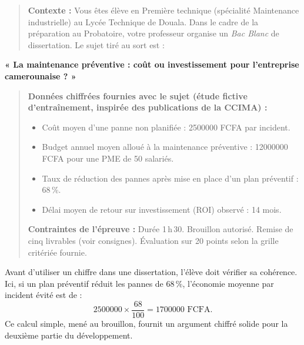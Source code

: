 \documentclass[11pt]{article}
\newcounter{popsec}
\newcounter{popsub}
\newcommand{\courssub}[1]{%
  \stepcounter{popsub}%
  \par\vspace{9pt}\noindent{\popxbold\fontsize{11.5}{13}\selectfont\color{popink}{\color{poporange}\thepopsec.\thepopsub}\hspace{6pt}#1}\par\nopagebreak\vspace{4pt}
}
\begin{document}
\courssub{Situation}
\begin{quote}
\textbf{Contexte :} Vous êtes élève en Première technique (spécialité Maintenance industrielle) au Lycée Technique de Douala. Dans le cadre de la préparation au Probatoire, votre professeur organise un \emph{Bac Blanc} de dissertation. Le sujet tiré au sort est :
\end{quote}
\begin{center}
\textbf{« La maintenance préventive : coût ou investissement pour l'entreprise camerounaise ? »}
\end{center}
\begin{quote}
\textbf{Données chiffrées fournies avec le sujet (étude fictive d'entraînement, inspirée des publications de la CCIMA) :}
\begin{itemize}
    \item Coût moyen d'une panne non planifiée : \num{2500000} FCFA par incident.
    \item Budget annuel moyen alloué à la maintenance préventive : \num{12000000} FCFA pour une PME de 50 salariés.
    \item Taux de réduction des pannes après mise en place d'un plan préventif : 68\,\%.
    \item Délai moyen de retour sur investissement (ROI) observé : 14 mois.
\end{itemize}
\textbf{Contraintes de l'épreuve :} Durée 1\,h\,30. Brouillon autorisé. Remise de cinq livrables (voir consignes). Évaluation sur 20 points selon la grille critériée fournie.
\end{quote}

\begin{attention}
Avant d'utiliser un chiffre dans une dissertation, l'élève doit vérifier sa cohérence. Ici, si un plan préventif réduit les pannes de 68\,\%, l'économie moyenne par incident évité est de :
\[ \num{2500000} \times \frac{68}{100} = \num{1700000} \text{ FCFA}. \]
Ce calcul simple, mené au brouillon, fournit un argument chiffré solide pour la deuxième partie du développement.
\end{attention}
\end{document}
